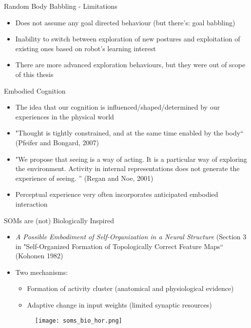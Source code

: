 \documentclass[xcolor=x11names,dvipsnames,compress]{beamer}
\renewcommand{\(}{\begin{columns}}
\renewcommand{\)}{\end{columns}}
\newcommand{\<}[1]{\begin{column}{#1}}
\renewcommand{\>}{\end{column}}
\begin{document}
\begin{frame}{Random Body Babbling - Limitations}
\begin{itemize}       
      \item Does not assume any goal directed behaviour (but there's: goal babbling) 
      \item Inability to switch between exploration of new postures and exploitation of existing ones based on robot's learning interest
      \item There are more advanced exploration behaviours, but they were out of scope of this thesis	
\end{itemize}
\end{frame}


\begin{frame}{Embodied Cognition}
\begin{itemize}
      \item The idea that our cognition is influenced/shaped/determined by our experiences in the physical world
      \item "Thought is tightly constrained, and at the same time enabled by the body`` (Pfeifer and Bongard, 2007)
      \item "We propose that seeing is a way of acting. It
is a particular way of exploring the environment. Activity in internal representations does not generate the experience of seeing. '' (Regan and Noe, 2001)
      \item Perceptual experience very often incorporates anticipated embodied interaction

\end{itemize}
\end{frame}



\begin{frame}{SOMs are (not) Biologically Inspired}
\begin{itemize}       
      \item \emph{A Possible Embodiment of Self-Organization in a Neural Structure} (Section 3 in "Self-Organized Formation of Topologically Correct Feature Maps`` (Kohonen 1982)
      \item Two mechanisms:
      \begin{itemize}
        \item Formation of activity cluster (anatomical and physiological evidence)
	\item Adaptive change in input weights (limited synaptic resources)
      \end{itemize}

      \begin{figure}[t]
      \centering
      \texttt{[image: soms\_bio\_hor.png]}      
      \end{figure}

\end{itemize}
\end{frame}
\end{document}
